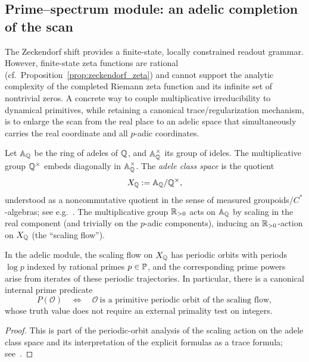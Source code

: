 \subsection{Prime--spectrum module: an adelic completion of the scan}
The Zeckendorf shift provides a finite-state, locally constrained readout grammar. However, finite-state zeta functions are rational (cf.~Proposition~\ref{prop:zeckendorf_zeta}) and cannot support the analytic complexity of the completed Riemann zeta function and its infinite set of nontrivial zeros. A concrete way to couple multiplicative irreducibility to dynamical primitives, while retaining a canonical trace/regularization mechanism, is to enlarge the scan from the real place to an adelic space that simultaneously carries the real coordinate and all $p$-adic coordinates.

\begin{definition}
Let $\mathbb{A}_{\mathbb{Q}}$ be the ring of adeles of $\mathbb{Q}$, and $\mathbb{A}_{\mathbb{Q}}^\times$ its group of ideles. The multiplicative group $\mathbb{Q}^\times$ embeds diagonally in $\mathbb{A}_{\mathbb{Q}}^\times$. The \emph{adele class space} is the quotient
$$
X_{\mathbb{Q}}:=\mathbb{A}_{\mathbb{Q}}/\mathbb{Q}^\times,
$$
understood as a noncommutative quotient in the sense of measured groupoids/$C^*$-algebras; see e.g.~\cite{Connes1999,Connes1994}.
The multiplicative group $\mathbb{R}_{>0}$ acts on $\mathbb{A}_{\mathbb{Q}}$ by scaling in the real component (and trivially on the $p$-adic components), inducing an $\mathbb{R}_{>0}$-action on $X_{\mathbb{Q}}$ (the ``scaling flow'').
\end{definition}

\begin{proposition}
\label{prop:adelic_prime_orbits}
In the adelic module, the scaling flow on $X_{\mathbb{Q}}$ has periodic orbits with periods $\log p$ indexed by rational primes $p\in\mathbb{P}$, and the corresponding prime powers arise from iterates of these periodic trajectories. In particular, there is a canonical internal prime predicate
$$
P(\mathcal{O})\quad\Longleftrightarrow\quad \mathcal{O}\ \text{is a primitive periodic orbit of the scaling flow},
$$
whose truth value does not require an external primality test on integers.
\end{proposition}

\begin{proof}
This is part of the periodic-orbit analysis of the scaling action on the adele class space and its interpretation of the explicit formulas as a trace formula; see~\cite{Connes1999}.
\end{proof}

